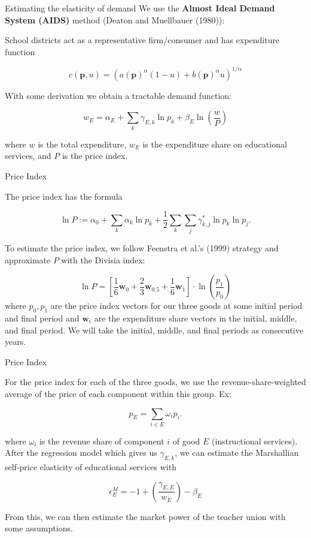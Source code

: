 \documentclass[12pt,aspectratio=169]{beamer} %
\begin{document}
\begin{frame}{Estimating the elasticity of demand}
We use the \textbf{Almost Ideal Demand System (AIDS)} method (Deaton and Muellbauer (1980)):

School districts act as a representative firm/consumer and has expenditure function
	
	\[
	c\left(\mathbf{p}, u\right) = \left(a \left(\mathbf{p}\right)^\alpha \left(1 - u\right) + b\left(\mathbf{p}\right)^\alpha u\right)^{1/\alpha}
	\]

With some derivation we obtain a tractable demand function:

\[
w_E = \alpha_E + \sum_k \gamma_{E, k} \ln p_k + \beta_E \ln \left(\frac{w}{P}\right)
\]

where $w$ is the total expenditure, $w_E$ is the expenditure share on educational services, and $P$ is the price index.
\end{frame}

\begin{frame}{Price Index}

The price index has the formula

\[
\ln P := \alpha_0 + \sum_k \alpha_k \ln p_k + \frac{1}{2} \sum_k\sum_j \gamma_{k,j}^* \ln p_k \ln p_j.
\]

To estimate the price index, we follow Feenstra et al.'s (1999) strategy and approximate $P$ with the Divisia index:

\[
\ln P = \left[\frac{1}{6}\mathbf{w}_0 + \frac{2}{3}\mathbf{w}_{0.5} + \frac{1}{6}\mathbf{w}_1\right]\cdot \ln \left(\frac{p_1}{p_0}\right)
\]
where $p_0, p_1$ are the price index vectors for our three goods at some initial period and final period and $\mathbf{w}_i$ are the expenditure share vectors in the initial, middle, and final period. We will take the initial, middle, and final periods as consecutive years.
\end{frame}

\begin{frame}{Price Index}

For the price index for each of the three goods, we use the revenue-share-weighted average of the price of each component within this group. Ex:

\[
p_E = \sum_{i\in E} \omega_i p_i.
\]

where $\omega_i$ is the revenue share of component $i$ of good $E$ (instructional services). After the regression model which gives us $\gamma_{E, k}$, we can estimate the Marshallian self-price elasticity of educational services with

\[
\epsilon^M_E = -1 + \left(\frac{\gamma_{E,E}}{w_E}\right) - \beta_E
\]

From this, we can then estimate the market power of the teacher union with some assumptions.
\end{frame}
\end{document}
